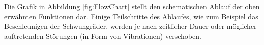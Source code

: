 \noindent Die Grafik in Abbildung \ref{fig:FlowChart} stellt den 
schematischen Ablauf der oben erwähnten Funktionen dar. Einige Teilschritte 
des Ablaufes, wie zum Beispiel das Beschleunigen der Schwungräder, werden 
je nach zeitlicher Dauer oder möglicher auftretenden Störungen (in Form von 
Vibrationen) verschoben.